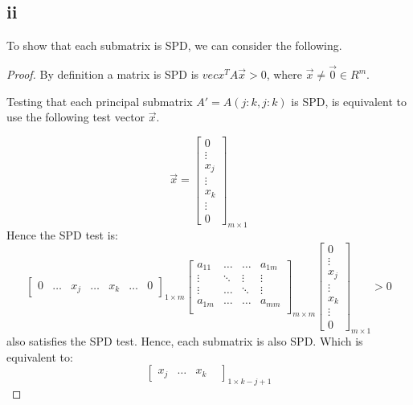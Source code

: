 \documentclass[10pt]{article}
\begin{document}
\subsection{ii}
  To show that each submatrix is SPD, we can consider the following.
  \begin{proof}
    By definition a matrix is SPD is $vec{x}^TA\vec{x} >0$, where
  $\vec{x}\neq \vec{0} \in R^m$.
    
    Testing that each principal submatrix $A'=A(j:k,j:k)$ is SPD, is 
  equivalent to use the following test vector $\vec{x}$.

  \[
    \vec{x} = 
    \begin{bmatrix}
        0  \\
        \vdots \\
        x_j \\
        \vdots \\
        x_k \\
        \vdots \\
        0
     \end{bmatrix}_{m\times 1}
  \] 
  Hence the SPD test is:
 \[
    \begin{bmatrix}
        0  &
        \dots &
        x_j &
        \dots &
        x_k &
        \dots &
        0
     \end{bmatrix}_{1\times m}
    \begin{bmatrix}
        a_{11}  & \dots & \dots & a_{1m} \\
         \vdots & \ddots & \vdots & \vdots \\
         \vdots & \dots & \ddots & \vdots \\
        a_{1m}  & \dots & \dots & a_{mm} \\
     \end{bmatrix}_{m\times m}
      \begin{bmatrix}
        0  \\
        \vdots \\
        x_j \\
        \vdots \\
        x_k \\
        \vdots \\
        0
     \end{bmatrix}_{m\times 1} >0
 \]  
  also satisfies the SPD test. Hence, each submatrix is also SPD. 
  Which is equivalent to:
 \[
    \begin{bmatrix}
        x_j &
        \dots &
        x_k &
     \end{bmatrix}_{1\times k-j+1}
\]
\end{proof}
\end{document}
